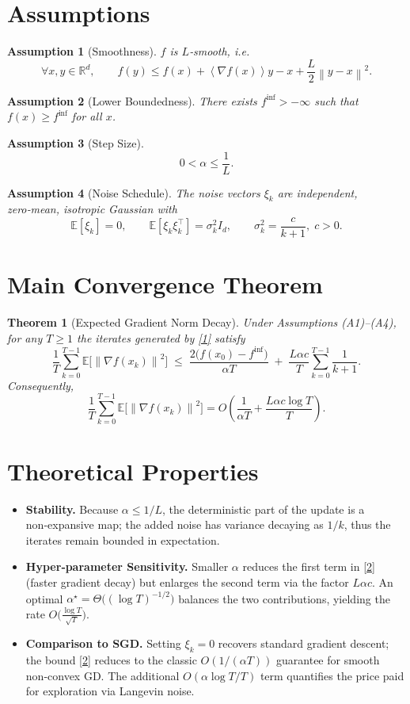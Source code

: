 \documentclass[11pt]{article}
\newtheorem{theorem}{Theorem}
\newtheorem{assumption}{Assumption}
\newcommand{\E}{\mathbb{E}}
\newcommand{\R}{\mathbb{R}}
\newcommand{\norm}[1]{\left\|#1\right\|}
\newcommand{\inner}[1]{\left\langle#1\right\rangle}
\begin{document}
\newpage
\section*{Assumptions}
\begin{assumption}[Smoothness]
$f$ is $L$‑smooth, i.e.
\[
\forall x,y\in\R^{d},\qquad 
f(y)\le f(x)+\inner{\nabla f(x)}{y-x}+\frac{L}{2}\norm{y-x}^{2}.
\tag{A1}
\]
\end{assumption}
\begin{assumption}[Lower Boundedness]
There exists $f^{\inf}>-\infty$ such that $f(x)\ge f^{\inf}$ for all $x$.
\end{assumption}
\begin{assumption}[Step Size]
\[
0<\alpha\le\frac{1}{L}.
\tag{A3}
\]
\end{assumption}
\begin{assumption}[Noise Schedule]
The noise vectors $\xi_{k}$ are independent, zero‑mean, isotropic Gaussian with
\[
\E[\xi_{k}]=0,\qquad 
\E[\xi_{k}\xi_{k}^{\top}]=\sigma_{k}^{2} I_{d},\qquad 
\sigma_{k}^{2}= \frac{c}{k+1},\;c>0.
\tag{A4}
\]
\end{assumption}

\section*{Main Convergence Theorem}
\begin{theorem}[Expected Gradient Norm Decay]\label{thm:main}
Under Assumptions (A1)–(A4), for any $T\ge1$ the iterates generated by \eqref{1} satisfy
\[
\frac{1}{T}\sum_{k=0}^{T-1}\E\!\big[\norm{\nabla f(x_{k})}^{2}\big]
\;\le\;
\frac{2\big(f(x_{0})-f^{\inf}\big)}{\alpha T}
\;+\;
\frac{L\alpha c}{T}\sum_{k=0}^{T-1}\frac{1}{k+1}.
\tag{2}
\]
Consequently,
\[
\frac{1}{T}\sum_{k=0}^{T-1}\E\!\big[\norm{\nabla f(x_{k})}^{2}\big]
=
O\!\left(\frac{1}{\alpha T}+\frac{L\alpha c\log T}{T}\right).
\tag{3}
\]
\end{theorem}

\section*{Theoretical Properties}
\begin{itemize}
\item \textbf{Stability.} Because $\alpha\le 1/L$, the deterministic part of the update is a non‑expansive map; the added noise has variance decaying as $1/k$, thus the iterates remain bounded in expectation.
\item \textbf{Hyper‑parameter Sensitivity.} Smaller $\alpha$ reduces the first term in \eqref{2} (faster gradient decay) but enlarges the second term via the factor $L\alpha c$. An optimal $\alpha^{\star}= \Theta\big((\log T)^{-1/2}\big)$ balances the two contributions, yielding the rate $O\!\big(\frac{\log T}{\sqrt{T}}\big)$.
\item \textbf{Comparison to SGD.} Setting $\xi_{k}=0$ recovers standard gradient descent; the bound \eqref{2} reduces to the classic $O(1/(\alpha T))$ guarantee for smooth non‑convex GD. The additional $O(\alpha\log T/T)$ term quantifies the price paid for exploration via Langevin noise.
\end{itemize}
\end{document}
